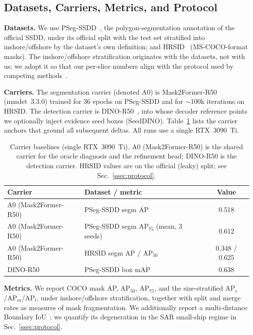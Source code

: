 \documentclass[journal]{IEEEtran}
\begin{document}
\subsection{Datasets, Carriers, Metrics, and Protocol}
\label{ssec:setup}
\textbf{Datasets.} We use PSeg-SSDD~\cite{zhang2021ssdd}, the polygon-segmentation annotation of the official SSDD, under its official split with the test set stratified into inshore/offshore by the dataset's own definition; and HRSID~\cite{wei2020hrsid} (MS-COCO-format masks). The inshore/offshore stratification originates with the datasets, not with us; we adopt it so that our per-slice numbers align with the protocol used by competing methods~\cite{gao2025o2former,xu2025diffsarshipinst}.

\textbf{Carriers.} The segmentation carrier (denoted A0) is Mask2Former-R50~\cite{cheng2022mask2former} (mmdet~3.3.0) trained for 36 epochs on PSeg-SSDD and for $\sim$100k iterations on HRSID. The detection carrier is DINO-R50~\cite{zhang2023dino}, into whose decoder reference points we optionally inject evidence seed boxes (SeedDINO). Table~\ref{tab:carriers} lists the carrier anchors that ground all subsequent deltas. All runs use a single RTX~3090~Ti.

\begin{table}[t]
\centering
\caption{Carrier baselines (single RTX~3090~Ti). A0 (Mask2Former-R50) is the shared carrier for the oracle diagnosis and the refinement head; DINO-R50 is the detection carrier. HRSID values are on the official (leaky) split; see Sec.~\ref{ssec:protocol}.}
\label{tab:carriers}
\begin{tabular}{@{}llc@{}}
\toprule
Carrier & Dataset / metric & Value \\
\midrule
A0 (Mask2Former-R50) & PSeg-SSDD segm AP & 0.518 \\
A0 (Mask2Former-R50) & PSeg-SSDD segm AP$_{75}$ (mean, 3 seeds) & 0.612 \\
A0 (Mask2Former-R50) & HRSID segm AP / AP$_{50}$ & 0.348 / 0.625 \\
DINO-R50             & PSeg-SSDD box mAP & 0.638 \\
\bottomrule
\end{tabular}
\end{table}

\textbf{Metrics.} We report COCO mask AP, AP$_{50}$, AP$_{75}$, and the size-stratified AP$_{s}$/AP$_{m}$/AP$_{l}$, under inshore/offshore stratification, together with split and merge rates as measures of mask fragmentation. We additionally report a multi-distance Boundary IoU~\cite{cheng2021boundary}; we quantify its degeneration in the SAR small-ship regime in Sec.~\ref{ssec:protocol}.
\end{document}
